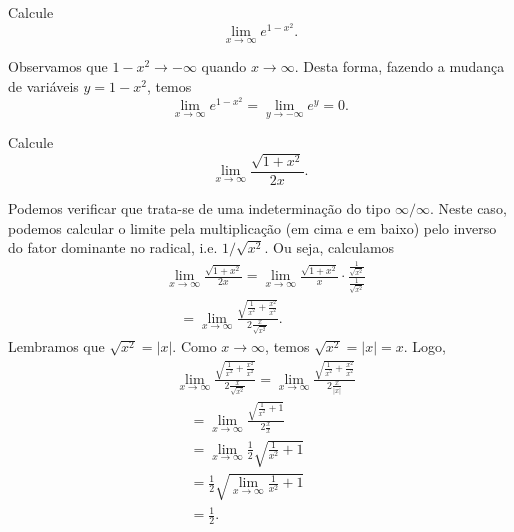 \begin{exeresol}
  Calcule
  \begin{equation}
    \lim_{x\to \infty} e^{1-x^2}.
  \end{equation}
\end{exeresol}
\begin{resol}
  Observamos que $1-x^2\to -\infty$ quando $x\to \infty$. Desta forma, fazendo a mudança de variáveis $y = 1 - x^2$, temos
  \begin{equation}
    \lim_{x\to\infty} e^{1-x^2} = \lim_{y\to -\infty} e^y = 0.
  \end{equation}
\end{resol}

\begin{exeresol}
  Calcule
  \begin{equation}
    \lim_{x\to\infty} \frac{\sqrt{1+x^2}}{2x}.
  \end{equation}
\end{exeresol}
\begin{resol}
  Podemos verificar que trata-se de uma indeterminação do tipo $\infty/\infty$. Neste caso, podemos calcular o limite pela multiplicação (em cima e em baixo) pelo inverso do fator dominante no radical, i.e. $1/\sqrt{x^2}$. Ou seja, calculamos
  \begin{align}
    & \lim_{x\to\infty} \frac{\sqrt{1+x^2}}{2x} = \lim_{x\to\infty} \frac{\sqrt{1+x^2}}{x}\cdot \frac{\frac{1}{\sqrt{x^2}}}{\frac{1}{\sqrt{x^2}}} \\
    & \text{}\quad = \lim_{x\to\infty} \frac{\sqrt{\frac{1}{x^2}+\frac{x^2}{x^2}}}{2\frac{x}{\sqrt{x^2}}}.
  \end{align}
  Lembramos que $\sqrt{x^2}=|x|$. Como $x\to\infty$, temos $\sqrt{x^2} = |x|=x$. Logo,
  \begin{align}
    & \lim_{x\to\infty} \frac{\sqrt{\frac{1}{x^2}+\frac{x^2}{x^2}}}{2\frac{x}{\sqrt{x^2}}} = \lim_{x\to\infty} \frac{\sqrt{\frac{1}{x^2}+\frac{x^2}{x^2}}}{2\frac{x}{|x|}} \\
    & \text{}\quad = \lim_{x\to\infty} \frac{\sqrt{\frac{1}{x^2}+1}}{2\frac{x}{x}} \\
    & \text{}\quad = \lim_{x\to\infty} \frac{1}{2}\sqrt{\frac{1}{x^2}+1} \\
    & \text{}\quad = \frac{1}{2}\sqrt{\lim_{x\to\infty} \frac{1}{x^2}+1} \\
    & \text{}\quad = \frac{1}{2}.
  \end{align}
\end{resol}


